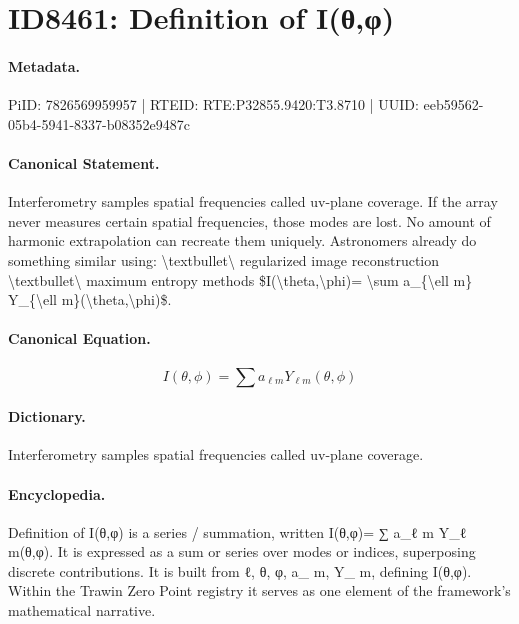 \section*{ID8461: Definition of I(θ,φ)}
\paragraph{Metadata.}
PiID: 7826569959957 | RTEID: RTE:P32855.9420:T3.8710 | UUID: eeb59562-05b4-5941-8337-b08352e9487c

\paragraph{Canonical Statement.}
Interferometry samples spatial frequencies called uv-plane coverage. If the array never measures certain spatial frequencies, those modes are lost. No amount of harmonic extrapolation can recreate them uniquely. Astronomers already do something similar using: \textbackslash{}textbullet\textbackslash{} regularized image reconstruction \textbackslash{}textbullet\textbackslash{} maximum entropy methods \$I(\textbackslash{}theta,\textbackslash{}phi)= \textbackslash{}sum a\_\{\textbackslash{}ell m\} Y\_\{\textbackslash{}ell m\}(\textbackslash{}theta,\textbackslash{}phi)\$.

\paragraph{Canonical Equation.}
\[
I(\theta,\phi)= \sum a_{\ell m} Y_{\ell m}(\theta,\phi)
\]

\paragraph{Dictionary.}
Interferometry samples spatial frequencies called uv-plane coverage.

\paragraph{Encyclopedia.}
Definition of I(θ,φ) is a series / summation, written I(θ,φ)= ∑ a\_ℓ m Y\_ℓ m(θ,φ). It is expressed as a sum or series over modes or indices, superposing discrete contributions. It is built from ℓ, θ, φ, a\_ m, Y\_ m, defining I(θ,φ). Within the Trawin Zero Point registry it serves as one element of the framework's mathematical narrative.
